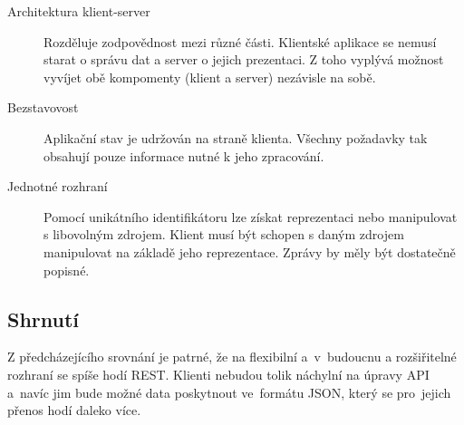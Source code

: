 \begin{description}
    \item[Architektura klient-server]
    Rozděluje zodpovědnost mezi různé části. Klientské aplikace se nemusí starat o správu dat a server o jejich prezentaci.
    Z toho vyplývá možnost vyvíjet obě kompomenty (klient a server) nezávisle na sobě.
    \item[Bezstavovost]
    Aplikační stav je udržován na straně klienta. Všechny požadavky tak obsahují pouze informace nutné k jeho zpracování.  
    \item[Jednotné rozhraní]
    Pomocí unikátního identifikátoru lze získat reprezentaci nebo manipulovat s libovolným zdrojem.
    Klient musí být schopen s daným zdrojem manipulovat na základě jeho reprezentace. Zprávy by měly být dostatečně popisné.
\end{description}

\subsection{Shrnutí}

Z předcházejícího srovnání je patrné, že na flexibilní a~v~budoucnu a rozšiřitelné rozhraní se spíše hodí REST.
Klienti nebudou tolik náchylní na úpravy API a~navíc jim bude možné data poskytnout ve~formátu JSON,
který se pro~jejich přenos hodí daleko více.
